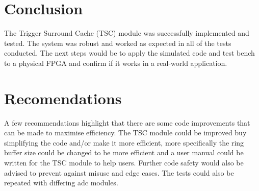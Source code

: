 \section{Conclusion}

The Trigger Surround Cache (TSC) module was successfully implemented and tested.
The system was robust and worked as expected in all of the tests conducted.
The next steps would be to apply the simulated code and test bench to a physical FPGA and confirm if it works in a real-world application.

\section{Recomendations}

A few recommendations highlight that there are some code improvements that can be made to maximise efficiency.
The TSC module could be improved buy simplifying the code and/or make it more efficient, more specifically the ring buffer size could be changed to be more efficient and a user manual could be written for the TSC module to help users.
Further code safety would also be advised to prevent against misuse and edge cases.
The tests could also be repeated with differing adc modules.
